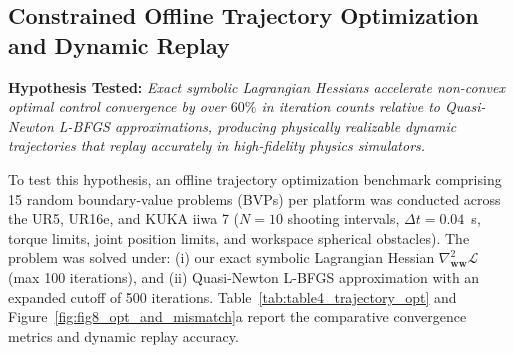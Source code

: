 \documentclass[fleqn,10pt]{article}
\begin{document}
\subsection{Constrained Offline Trajectory Optimization and Dynamic Replay}

\noindent\textbf{Hypothesis Tested:} \textit{Exact symbolic Lagrangian Hessians accelerate non-convex optimal control convergence by over $60\%$ in iteration counts relative to Quasi-Newton L-BFGS approximations, producing physically realizable dynamic trajectories that replay accurately in high-fidelity physics simulators.}

To test this hypothesis, an offline trajectory optimization benchmark comprising 15 random boundary-value problems (BVPs) per platform was conducted across the UR5, UR16e, and KUKA iiwa 7 ($N=10$ shooting intervals, $\Delta t = 0.04$~s, torque limits, joint position limits, and workspace spherical obstacles). The problem was solved under: (i) our exact symbolic Lagrangian Hessian $\nabla_{\bm{w}\bm{w}}^2 \mathcal{L}$ (max 100 iterations), and (ii) Quasi-Newton L-BFGS approximation with an expanded cutoff of 500 iterations. Table~\ref{tab:table4_trajectory_opt} and Figure~\ref{fig:fig8_opt_and_mismatch}a report the comparative convergence metrics and dynamic replay accuracy.
\end{document}

